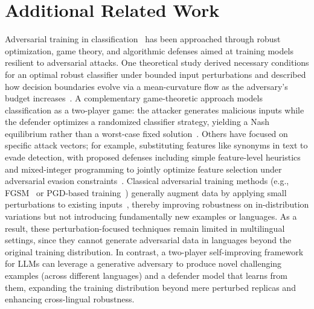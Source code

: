 \section{Additional Related Work}\label{app:related}
Adversarial training in classification~\citep{bai2021recent,machado2021adversarial} has been approached through robust optimization, game theory, and algorithmic defenses aimed at training models resilient to adversarial attacks. One theoretical study derived necessary conditions for an optimal robust classifier under bounded input perturbations and described how decision boundaries evolve via a mean-curvature flow as the adversary’s budget increases~\citep{trillos2022adversarial}. A complementary game-theoretic approach models classification as a two-player game: the attacker generates malicious inputs while the defender optimizes a randomized classifier strategy, yielding a Nash equilibrium rather than a worst-case fixed solution~\citep{dritsoula2017game}. 
Others have focused on specific attack vectors; for example, substituting features like synonyms in text to evade detection, with proposed defenses including simple feature-level heuristics and mixed-integer programming to jointly optimize feature selection under adversarial evasion constraints~\citep{li2014feature}. Classical adversarial training methods (e.g., FGSM~\citep{goodfellow2014explaining} or PGD-based training~\citep{madry2017towards}) generally augment data by applying small perturbations to existing inputs~\citep{trillos2022adversarial}, thereby improving robustness on in-distribution variations but not introducing fundamentally new examples or languages. As a result, these perturbation-focused techniques remain limited in multilingual settings, since they cannot generate adversarial data in languages beyond the original training distribution. In contrast, a two-player self-improving framework for LLMs can leverage a generative adversary to produce novel challenging examples (across different languages) and a defender model that learns from them, expanding the training distribution beyond mere perturbed replicas and enhancing cross-lingual robustness.


